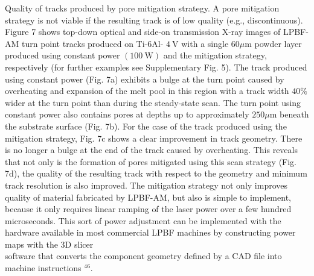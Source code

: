 \documentclass[10pt]{article}
\begin{document}
Quality of tracks produced by pore mitigation strategy. A pore mitigation strategy is not viable if the resulting track is of low quality (e.g., discontinuous). Figure 7 shows top-down optical and side-on transmission X-ray images of LPBF-AM turn point tracks produced on Ti-6Al- $4 \mathrm{~V}$ with a single $60 \mu \mathrm{m}$ powder layer produced using constant power $(100 \mathrm{~W})$ and the mitigation strategy, respectively (for further examples see Supplementary Fig. 5). The track produced using constant power (Fig. 7a) exhibits a bulge at the turn point caused by overheating and expansion of the melt pool in this region with a track width $40 \%$ wider at the turn point than during the steady-state scan. The turn point using constant power also contains pores at depths up to approximately $250 \mu \mathrm{m}$ beneath the substrate surface (Fig. 7b). For the case of the track produced using the mitigation strategy, Fig. 7c shows a clear improvement in track geometry. There is no longer a bulge at the end of the track caused by overheating. This reveals that not only is the formation of pores mitigated using this scan strategy (Fig. 7d), the quality of the resulting track with respect to the geometry and minimum track resolution is also improved. The mitigation strategy not only improves quality of material fabricated by LPBF-AM, but also is simple to implement, because it only requires linear ramping of the laser power over a few hundred microseconds. This sort of power adjustment can be implemented with the hardware available in most commercial LPBF machines by constructing power maps with the 3D slicer\\
software that converts the component geometry defined by a CAD file into machine instructions ${ }^{46}$.
\end{document}
